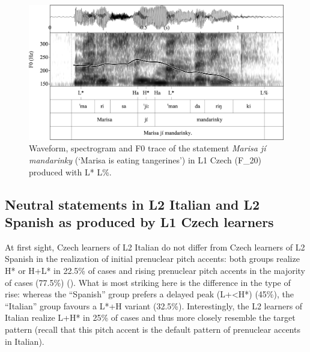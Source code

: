 \begin{figure}
\includegraphics[width=\textwidth]{figures/Figure_4.17.png}
\caption{Waveform, spectrogram and F0 trace of the statement \textit{Marisa jí mandarinky} (‘Marisa is eating tangerines’) in L1 Czech \mbox{(F\_20)} produced with L* L\%.}
\label{fig:4.17}
\end{figure}

\subsection{Neutral statements in L2 Italian and L2 Spanish as produced by L1 Czech learners}\label{sec:4.1.3}

At first sight, Czech learners of L2 Italian do not differ from Czech learners of L2 Spanish in the realization of initial prenuclear pitch accents: both groups realize H* or H+L* in 22.5\% of cases and rising prenuclear pitch accents in the majority of cases (77.5\%) (). What is most striking here is the difference in the type of rise: whereas the “Spanish” group prefers a delayed peak (L+<H*) (45\%), the “Italian” group favours a L*+H variant (32.5\%). Interestingly, the L2 learners of Italian realize L+H* in 25\% of cases and thus more closely resemble the target pattern (recall that this pitch accent is the default pattern of prenuclear accents in Italian).

